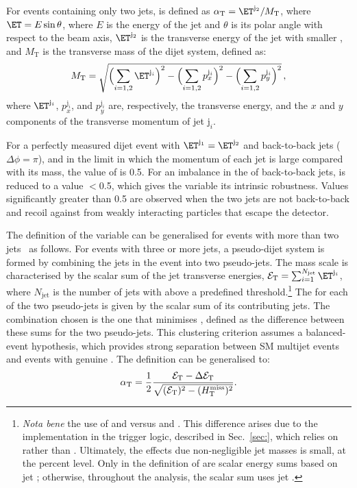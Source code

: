 For events containing only two jets, \alphat is defined as $\alphat =
\ET^{\mathrm{j}_2}/M_\mathrm{T}$, where $\ET= E\sin\theta$, where $E$
is the energy of the jet and $\theta$ is its polar angle with respect
to the beam axis, $\ET^{\mathrm{j}_2}$ is the transverse energy of the
jet with smaller \ET, and $M_\mathrm{T}$ is the transverse mass of the
dijet system, defined as:
\begin{equation}
  \label{eq:mt}
  M_\mathrm{T} = \sqrt{ \Bigl( \sum_{i=1,2} \ET^{\mathrm{j}_i}
    \Bigr)^2 - \Bigl( \sum_{i=1,2} p_x^{\mathrm{j}_i} \Bigr)^2 - \Bigl(
      \sum_{i=1,2} p_y^{\mathrm{j}_i} \Bigr)^2}\, ,
\end{equation}
where $\ET^{\mathrm{j}_i}$, $p_x^{\mathrm{j}_i}$, and
$p_y^{\mathrm{j}_i}$ are, respectively, the transverse energy, and the
$x$ and $y$ components of the transverse momentum of jet
$\mathrm{j}_i$.

For a perfectly measured dijet event with $\ET^{\mathrm{j_1}} =
\ET^{\mathrm{j_2}}$ and back-to-back jets ($\Delta\phi = \pi$), and in
the limit in which the momentum of each jet is large compared with its
mass, the value of \alphat is 0.5. For an imbalance in the \ET of
back-to-back jets, \alphat is reduced to a value $<$0.5, which gives
the variable its intrinsic robustness. Values significantly greater
than 0.5 are observed when the two jets are not back-to-back and
recoil against \ptvecmiss from weakly interacting particles that
escape the detector.

The definition of the \alphat variable can be generalised for events
with more than two jets~\cite{RA1Paper} as follows. For events with
three or more jets, a pseudo-dijet system is formed by combining the
jets in the event into two pseudo-jets. The mass scale is
characterised by the scalar sum of the jet transverse energies,
$\scalst = \sum_{i=1}^{N_\text{jet}} \ET^{\mathrm{j}_i}$, where
$N_\text{jet}$ is the number of jets with \ET above a predefined
threshold.\footnote{{\it Nota bene} the use of \Et and \scalst versus
  \Pt and \scalht. This difference arises due to the implementation in
  the trigger logic, described in Sec.~\ref{sec:}, which relies on \Et
  rather than \Pt. Ultimately, the effects due non-negligible jet
  masses is small, at the percent level. Only in the definition of
  \alphat are scalar energy sums based on jet \Et; otherwise,
  throughout the analysis, the scalar sum \scalht uses jet \Pt.} The
\scalst for each of the two pseudo-jets is given by the scalar \ET sum
of its contributing jets. The combination chosen is the one that
minimises \dst, defined as the difference between these sums for the
two pseudo-jets.  This clustering criterion assumes a balanced-event
hypothesis, which provides strong separation between SM multijet
events and events with genuine \ptvecmiss. The \alphat definition can
be generalised to:
\begin{equation}
  \label{eq:alphat}
  \alpha_{\text{T}} = \frac{1}{2} \frac{\mathcal{E}_\mathrm{T} -
    \Delta\mathcal{E}_\mathrm{T}}{\sqrt{(\mathcal{E}_\mathrm{T})^2 - (\mbox{$H_{\rm T}^{\rm miss}$})^2}}.
\end{equation}

